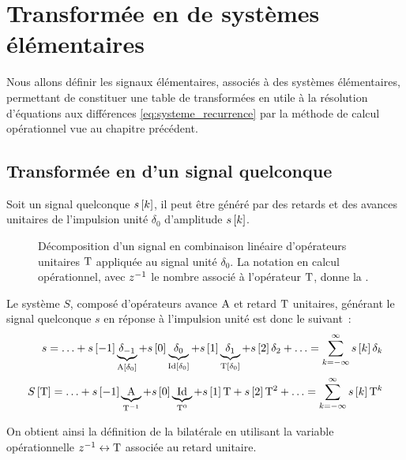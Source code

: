 \section{Transformée en \tZ{} de systèmes élémentaires}
Nous allons définir les signaux élémentaires, associés à des systèmes
élémentaires, permettant de constituer une table de transformées en
\tZ{} utile à la résolution d'équations aux différences
\eqref{eq:systeme_recurrence} par la méthode de calcul opérationnel
vue au chapitre précédent.

\subsection{Transformée en \tZ{} d'un signal quelconque}

Soit un signal quelconque $s\left[k\right]$, il peut être généré par des
retards et des avances unitaires de l'impulsion unité $\delta_0$
d'amplitude $s\left[k\right]$.

\begin{figure}[ht!]
  \centering
  \caption{Décomposition d'un signal en combinaison linéaire
    d'opérateurs unitaires $\mathrm{T}$ appliquée au signal unité
    $\delta_0$. La notation en calcul opérationnel, avec $z^{-1}$ le
    nombre associé à l'opérateur $\mathrm{T}$, donne la \teZ.}
  \label{fig:decomposition_unite}
\end{figure}
Le système $S$, composé d'opérateurs avance
$\mathrm{A}$ et retard $\mathrm{T}$ unitaires, générant le signal quelconque
$s$ en réponse à l'impulsion unité est donc le suivant~:
\begin{eqnarray}
  s = \ldots +  s\left[-1\right] \underbrace{\delta_{-1}}_{\mathrm{A}\left[\delta_0\right]} + s\left[0\right] \underbrace{\delta_0}_{\mathrm{Id}\left[\delta_0\right]} + s\left[1\right] \underbrace{\delta_{1}}_{\mathrm{T}\left[\delta_0\right]} +  s\left[2\right] \delta_{2} + \ldots = \sum\limits_{k=-\infty}^{\infty}{s\left[k\right]\delta_{k}}\\
  S\left[\mathrm{T}\right] = \ldots + s\left[-1\right] \underbrace{\mathrm{A}}_{\mathrm{T}^{-1}} + s\left[0\right]
  \underbrace{\mathrm{Id}}_{\mathrm{T}^0} + s\left[1\right] \mathrm{T} + s\left[2\right] \mathrm{T}^2 + \ldots =
  \sum\limits_{k=-\infty}^{\infty}{s\left[k\right]\mathrm{T}^{k}}
\end{eqnarray}

On obtient ainsi la définition de la \teZ{} bilatérale en utilisant la
variable opérationnelle $z^{-1}\leftrightarrow \mathrm{T}$ associée au retard
unitaire.


